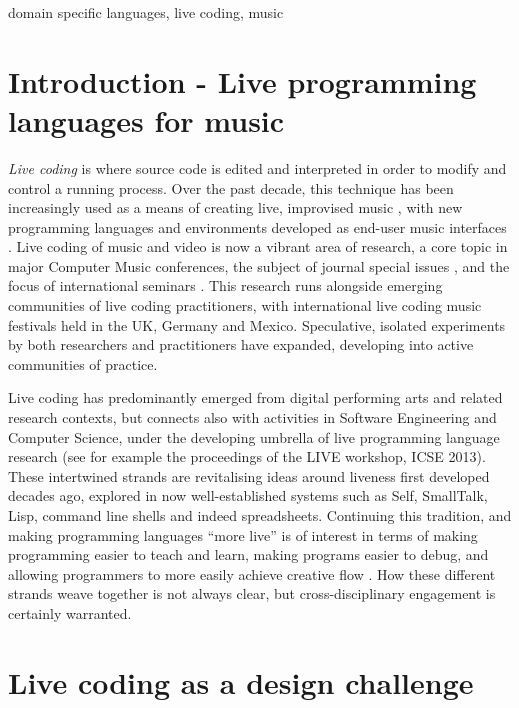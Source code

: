 \documentclass[authoryear,preprint]{sigplanconf}
\begin{document}
\keywords
domain specific languages, live coding, music

\section{Introduction - Live programming languages for music}

\emph{Live coding} is where source code is edited and interpreted in
order to modify and control a running process. Over the past decade,
this technique has been increasingly used as a means of creating live,
improvised music \citep{Collins03a}, with new programming languages
and environments developed as end-user music interfaces
\citep[e.g.][]{Wang04, Sorensen05, Aaron11, McLean10c}. Live coding of
music and video is now a vibrant area of research, a core topic in
major Computer Music conferences, the subject of journal special
issues \cite{McLean14}, and the focus of international seminars
\citep{Blackwell14}. This research runs alongside emerging communities
of live coding practitioners, with international live coding music
festivals held in the UK, Germany and Mexico. Speculative, isolated
experiments by both researchers and practitioners have expanded,
developing into active communities of practice.

Live coding has predominantly emerged from digital performing arts and
related research contexts, but connects also with activities in
Software Engineering and Computer Science, under the developing
umbrella of live programming language research (see for example the
proceedings of the LIVE workshop, ICSE 2013). These intertwined
strands are revitalising ideas around liveness first developed decades
ago, explored in now well-established systems such as Self, SmallTalk,
Lisp, command line shells and indeed spreadsheets. Continuing this
tradition, and making programming languages ``more live'' is of
interest in terms of making programming easier to teach and learn,
making programs easier to debug, and allowing programmers to more
easily achieve creative flow \citep{Blackwell14}. How these different
strands weave together is not always clear, but cross-disciplinary
engagement is certainly warranted.

\section{Live coding as a design challenge}
\end{document}
